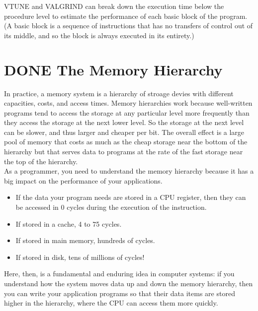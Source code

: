 \documentclass[11pt]{article}
\begin{document}
VTUNE and VALGRIND can break down the execution time below the procedure level to estimate the performance of each basic block of the program. (A basic block is a sequence of instructions that has no transfers of control out of its middle, and so the block is always executed in its entirety.)\\


\section{{\bfseries\sffamily DONE} The Memory Hierarchy}
\label{sec:orgf867a7b}
In practice, a memory system is a hierarchy of stroage devies with different capacities, costs, and access times. Memory hierarchies work because well-written programs tend to access the storage at any particular level more frequently than they access the storage at the next lower level. So the storage at the next level can be slower, and thus larger and cheaper per bit. The overall effect is a large pool of memory that costs as much as the cheap storage near the bottom of the hierarchy but that serves data to programs at the rate of the fast storage near the top of the hierarchy.\\

As a programmer, you need to understand the memory hierarchy because it has a big impact on the performance of your applications.\\
\begin{itemize}
\item If the data your program needs are stored in a CPU register, then they can be accessed in 0 cycles during the execution of the instruction.\\
\item If stored in a cache, 4 to 75 cycles.\\
\item If stored in main memory, hundreds of cycles.\\
\item If stored in disk, tens of millions of cycles!\\
\end{itemize}


Here, then, is a fundamental and enduring idea in computer systems: if you understand how the system moves data up and down the memory hierarchy, then you can write your application programs so that their data items are stored higher in the hierarchy, where the CPU can access them more quickly.\\
\end{document}
